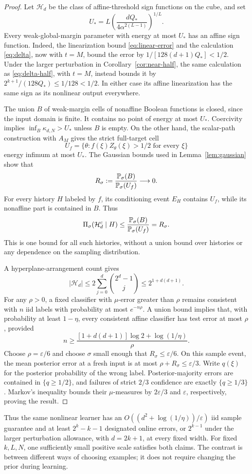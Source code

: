 \begin{proof}
Let $\mathcal H_d$ be the class of affine-threshold sign functions on
the cube, and set
\[
 U_*=L\left(\frac{dQ_*}{4\alpha^{2(L-1)}}\right)^{1/L}.
\]
Every weak-global-margin parameter with energy at most $U_*$ has an
affine sign function. Indeed, the linearization bound
\eqref{eq:linear-error} and the calculation \eqref{eq:delta}, now with
$t=M$, bound the error by
$1/[128(d+1)Q_*]<1/2$. Under the larger perturbation in
Corollary~\ref{cor:near-half}, the same calculation as
\eqref{eq:delta-half}, with $t=M$, instead bounds it by
$2^{k+1}/(128Q_*)\le1/128<1/2$. In either case its affine linearization
has the same sign as its nonlinear output everywhere.

The union $B$ of weak-margin cells of nonaffine Boolean functions is
closed, since the input domain is finite. It contains no point of
energy at most $U_*$. Coercivity implies $\inf_B\kappa_{d,N}>U_*$
unless $B$ is empty. On the other hand, the scalar-path construction
with $A_M$ gives the strict full-target cell
\[
 U_f=\{\theta:f(\xi)Z_\theta(\xi)>1/2\text{ for every }\xi\}
\]
energy infimum at most $U_*$. The Gaussian bounds used in
Lemma~\ref{lem:gaussian} show that
\[
 R_\sigma:=\frac{\mathbb P_\sigma(B)}{\mathbb P_\sigma(U_f)}\longrightarrow0.
\]
For every history $H$ labeled by $f$, its conditioning event $E_H$
contains $U_f$, while its nonaffine part is contained in $B$. Thus
\begin{equation}\label{eq:uniform-affine}
 \Pi_\sigma(\mathcal H_d^c\mid H)
 \le\frac{\mathbb P_\sigma(B)}{\mathbb P_\sigma(U_f)}=R_\sigma.
\end{equation}
This is one bound for all such histories, without a union bound over
histories or any dependence on the sampling distribution.

A hyperplane-arrangement count gives
\[
 |\mathcal H_d|\le2\sum_{j=0}^{d}\binom{2^d-1}{j}
                 \le2^{1+d(d+1)}.
\]
For any $\rho>0$, a fixed classifier with $\mu$-error greater than
$\rho$ remains consistent with $n$ iid labels with probability at most
$e^{-n\rho}$. A union bound implies that, with probability at least
$1-\eta$, every consistent affine classifier has test error at most
$\rho$, provided
\[
 n\ge\frac{[1+d(d+1)]\log2+\log(1/\eta)}\rho.
\]
Choose $\rho=\varepsilon/6$ and choose $\sigma$ small enough that
$R_\sigma\le\varepsilon/6$. On this sample event, the mean posterior
error at a fresh input is at most
$\rho+R_\sigma\le\varepsilon/3$.
Write $q(\xi)$ for the posterior probability of the wrong label.
Posterior-majority errors are contained in $\{q\ge1/2\}$, and failures
of strict $2/3$ confidence are exactly $\{q\ge1/3\}$.
Markov's inequality bounds their $\mu$-measures by
$2\varepsilon/3$ and $\varepsilon$, respectively, proving the result.
\end{proof}

Thus the same nonlinear learner has an
$O((d^2+\log(1/\eta))/\varepsilon)$ iid sample guarantee and at least
$2^k-k-1$ designated online errors, or $2^{k-1}$ under the larger
perturbation allowance, with $d=2k+1$, at every fixed width.
For fixed $k,L,N$, one sufficiently small positive scale satisfies both
claims. The contrast is between different ways of choosing examples;
it does not require changing the prior during learning.
